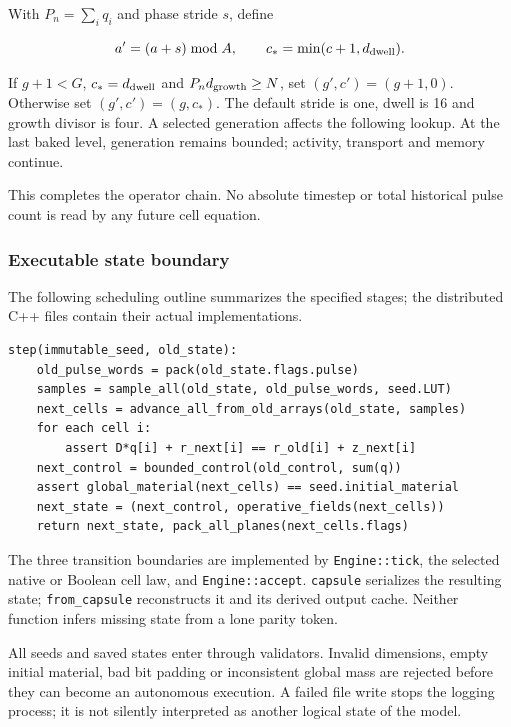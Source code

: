 \documentclass[11pt,a4paper]{article}
\begin{document}
With \(P_n=\sum_i q_i\) and phase stride \(s\), define

\[
a'=(a+s)\bmod A,\qquad c_*=\min(c+1,d_{\rm dwell}).
\]

If \(g+1<G\), \(c_*=d_{\rm dwell}\) and \(P_n d_{\rm growth}\ge N\), set
\((g',c')=(g+1,0)\). Otherwise set \((g',c')=(g,c_*)\). The default
stride is one, dwell is 16 and growth divisor is four. A selected
generation affects the following lookup. At the last baked level,
generation remains bounded; activity, transport and memory continue.

This completes the operator chain. No absolute timestep or total
historical pulse count is read by any future cell equation.

\subsubsection{Executable state
boundary}\label{executable-state-boundary}

The following scheduling outline summarizes the specified stages; the
distributed C++ files contain their actual implementations.

\begin{verbatim}
step(immutable_seed, old_state):
    old_pulse_words = pack(old_state.flags.pulse)
    samples = sample_all(old_state, old_pulse_words, seed.LUT)
    next_cells = advance_all_from_old_arrays(old_state, samples)
    for each cell i:
        assert D*q[i] + r_next[i] == r_old[i] + z_next[i]
    next_control = bounded_control(old_control, sum(q))
    assert global_material(next_cells) == seed.initial_material
    next_state = (next_control, operative_fields(next_cells))
    return next_state, pack_all_planes(next_cells.flags)
\end{verbatim}

The three transition boundaries are implemented by
\texttt{Engine::tick}, the selected native or Boolean cell law, and
\texttt{Engine::accept}. \texttt{capsule} serializes the resulting
state; \texttt{from\_capsule} reconstructs it and its derived output
cache. Neither function infers missing state from a lone parity token.

All seeds and saved states enter through validators. Invalid dimensions,
empty initial material, bad bit padding or inconsistent global mass are
rejected before they can become an autonomous execution. A failed file
write stops the logging process; it is not silently interpreted as
another logical state of the model.
\end{document}
